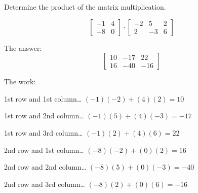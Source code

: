 
\begin{question}
Determine the product of the matrix multiplication.

\[\left[\begin{matrix}-1 & 4\\-8 & 0\end{matrix}\right] \cdot \left[\begin{matrix}-2 & 5 & 2\\2 & -3 & 6\end{matrix}\right]\]
\end{question}

\begin{solution}
The answer:
\[\left[\begin{matrix}10 & -17 & 22\\16 & -40 & -16\end{matrix}\right]\]

The work:

1st row and 1st column\ldots{} \((-1)(-2)+(4)(2) = 10\)

1st row and 2nd column\ldots{} \((-1)(5)+(4)(-3) = -17\)

1st row and 3rd column\ldots{} \((-1)(2)+(4)(6) = 22\)

2nd row and 1st column\ldots{} \((-8)(-2)+(0)(2) = 16\)

2nd row and 2nd column\ldots{} \((-8)(5)+(0)(-3) = -40\)

2nd row and 3rd column\ldots{} \((-8)(2)+(0)(6) = -16\)
\end{solution}

